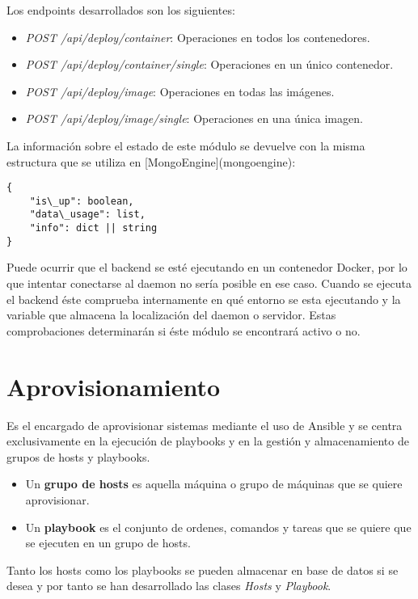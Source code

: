 \bigskip
Los endpoints desarrollados son los siguientes:
\begin{itemize}
	\item \textit{POST /api/deploy/container}: Operaciones en todos los contenedores.
	\item \textit{POST /api/deploy/container/single}: Operaciones en un único contenedor.
	\item \textit{POST /api/deploy/image}: Operaciones en todas las imágenes.
	\item \textit{POST /api/deploy/image/single}: Operaciones en una única imagen.
\end{itemize}


\bigskip
La información sobre el estado de este módulo se devuelve con la misma estructura que se utiliza en [MongoEngine](mongoengine):
\begin{lstlisting}
{
	"is\_up": boolean,
	"data\_usage": list,
	"info": dict || string
}
\end{lstlisting}



\bigskip
Puede ocurrir que el backend se esté ejecutando en un contenedor Docker, por lo que intentar conectarse al daemon no sería posible en ese caso. Cuando se ejecuta el backend éste comprueba internamente en qué entorno se esta ejecutando y la variable que almacena la localización del daemon o servidor. Estas comprobaciones determinarán si éste módulo se encontrará activo o no.




\section{Aprovisionamiento}


Es el encargado de aprovisionar sistemas mediante el uso de Ansible y se centra exclusivamente en la ejecución de playbooks y en la gestión y almacenamiento de grupos de hosts y playbooks.
\begin{itemize}
	\item Un \textbf{grupo de hosts} es aquella máquina o grupo de máquinas que se quiere aprovisionar.
	\item Un \textbf{playbook} es el conjunto de ordenes, comandos y tareas que se quiere que se ejecuten en un grupo de hosts.
\end{itemize}

\bigskip
Tanto los hosts como los playbooks se pueden almacenar en base de datos si se desea y por tanto se han desarrollado las clases \textit{Hosts} y \textit{Playbook}.



